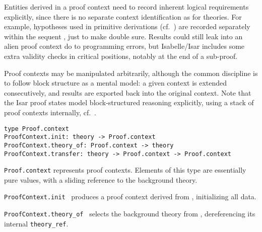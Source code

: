 \begin{isabellebody}
\begin{isamarkuptext}
  Entities derived in a proof context need to record inherent logical
  requirements explicitly, since there is no separate context
  identification as for theories.  For example, hypotheses used in
  primitive derivations (cf.\ ) are recorded
  separately within the sequent \isa{{\isasymGamma}\ {\isasymturnstile}\ {\isasymphi}}, just to make double
  sure.  Results could still leak into an alien proof context do to
  programming errors, but Isabelle/Isar includes some extra validity
  checks in critical positions, notably at the end of a sub-proof.

  Proof contexts may be manipulated arbitrarily, although the common
  discipline is to follow block structure as a mental model: a given
  context is extended consecutively, and results are exported back
  into the original context.  Note that the Isar proof states model
  block-structured reasoning explicitly, using a stack of proof
  contexts internally, cf.\ .%
\end{isamarkuptext}%
\isamarkuptrue%
%
\isadelimmlref
%
\endisadelimmlref
%
\isatagmlref
%
\begin{isamarkuptext}%
\begin{mldecls}
  \verb|type Proof.context| \\
  \verb|ProofContext.init: theory -> Proof.context| \\
  \verb|ProofContext.theory_of: Proof.context -> theory| \\
  \verb|ProofContext.transfer: theory -> Proof.context -> Proof.context| \\
  \end{mldecls}

  \begin{description}

  \item \verb|Proof.context| represents proof contexts.  Elements
  of this type are essentially pure values, with a sliding reference
  to the background theory.

  \item \verb|ProofContext.init|~ produces a proof context
  derived from , initializing all data.

  \item \verb|ProofContext.theory_of|~ selects the
  background theory from , dereferencing its internal
  \verb|theory_ref|.


\end{description}
\end{isamarkuptext}
\end{isabellebody}
